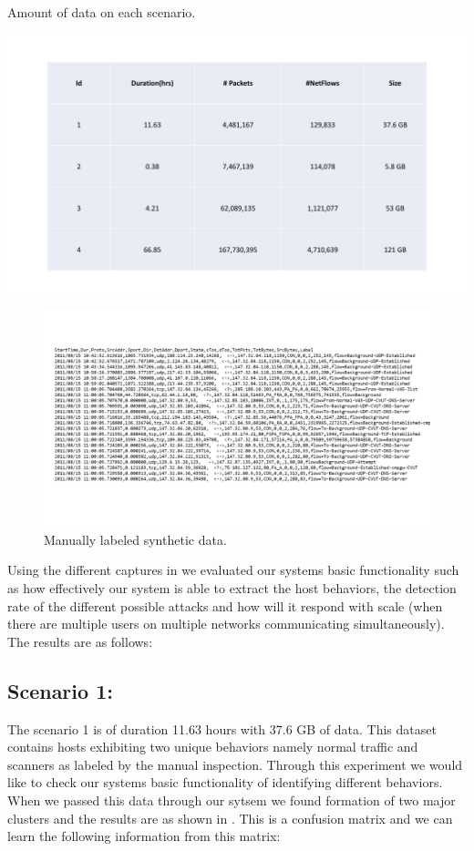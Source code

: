 \begin{table}[t]
	\caption{Amount of data on each scenario.}%
	\centerline{\includegraphics[scale = 0.5]{synth_desc.pdf}}	
\end{table}

\begin{figure}[b]
	\centerline{\includegraphics[trim=4cm 3cm 3cm 3cm, scale = 0.5]{ss_labeled.pdf}}
	\caption{Manually labeled synthetic data.}%
\end{figure}

	

Using the different captures in   we evaluated our systems basic functionality such as how effectively our system is able to extract the host behaviors, the detection rate of the different possible attacks and how will it respond with scale (when there are multiple users on multiple networks communicating simultaneously). The results are as follows:


\subsection{Scenario 1:}
The scenario 1 is of duration 11.63 hours with 37.6 GB of data. This dataset contains hosts exhibiting two unique behaviors namely normal traffic and scanners as labeled by the manual inspection. Through this experiment we would like to check our systems basic functionality of identifying different behaviors. When we passed this data through our sytsem we found formation of two major clusters and the results are as shown in  . This is a confusion matrix and we can learn the following information from this matrix:

